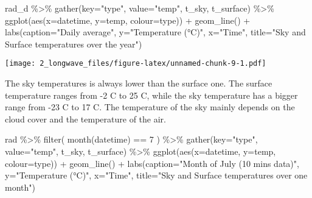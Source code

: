 \documentclass[
]{article}
\newenvironment{Shaded}{\begin{snugshade}}{\end{snugshade}}
\newcommand{\AttributeTok}[1]{\textcolor[rgb]{0.77,0.63,0.00}{#1}}
\newcommand{\DecValTok}[1]{\textcolor[rgb]{0.00,0.00,0.81}{#1}}
\newcommand{\FunctionTok}[1]{\textcolor[rgb]{0.00,0.00,0.00}{#1}}
\newcommand{\NormalTok}[1]{#1}
\newcommand{\SpecialCharTok}[1]{\textcolor[rgb]{0.00,0.00,0.00}{#1}}
\newcommand{\StringTok}[1]{\textcolor[rgb]{0.31,0.60,0.02}{#1}}
\begin{document}
\begin{Shaded}
\begin{Highlighting}[]
\NormalTok{rad\_d }\SpecialCharTok{\%\textgreater{}\%}
  \FunctionTok{gather}\NormalTok{(}\AttributeTok{key=}\StringTok{"type"}\NormalTok{, }\AttributeTok{value=}\StringTok{"temp"}\NormalTok{, t\_sky, t\_surface) }\SpecialCharTok{\%\textgreater{}\%}
\FunctionTok{ggplot}\NormalTok{(}\FunctionTok{aes}\NormalTok{(}\AttributeTok{x=}\NormalTok{datetime, }\AttributeTok{y=}\NormalTok{temp, }\AttributeTok{colour=}\NormalTok{type)) }\SpecialCharTok{+}
  \FunctionTok{geom\_line}\NormalTok{()  }\SpecialCharTok{+}
  \FunctionTok{labs}\NormalTok{(}\AttributeTok{caption=}\StringTok{"Daily average"}\NormalTok{, }\AttributeTok{y=}\StringTok{"Temperature (°C)"}\NormalTok{, }\AttributeTok{x=}\StringTok{"Time"}\NormalTok{,}
       \AttributeTok{title=}\StringTok{"Sky and Surface temperatures over the year"}\NormalTok{)}
\end{Highlighting}
\end{Shaded}

\texttt{[image: 2\_longwave\_files/figure-latex/unnamed-chunk-9-1.pdf]}

The sky temperatures is always lower than the surface one. The surface
temperature ranges from -2 C to 25 C, while the sky temperature has a
bigger range from -23 C to 17 C. The temperature of the sky mainly
depends on the cloud cover and the temperature of the air. \newpage

\begin{Shaded}
\begin{Highlighting}[]
\NormalTok{rad }\SpecialCharTok{\%\textgreater{}\%}
  \FunctionTok{filter}\NormalTok{( }\FunctionTok{month}\NormalTok{(datetime) }\SpecialCharTok{==} \DecValTok{7}\NormalTok{ ) }\SpecialCharTok{\%\textgreater{}\%}
  \FunctionTok{gather}\NormalTok{(}\AttributeTok{key=}\StringTok{"type"}\NormalTok{, }\AttributeTok{value=}\StringTok{"temp"}\NormalTok{, t\_sky, t\_surface) }\SpecialCharTok{\%\textgreater{}\%}
\FunctionTok{ggplot}\NormalTok{(}\FunctionTok{aes}\NormalTok{(}\AttributeTok{x=}\NormalTok{datetime, }\AttributeTok{y=}\NormalTok{temp, }\AttributeTok{colour=}\NormalTok{type)) }\SpecialCharTok{+}
  \FunctionTok{geom\_line}\NormalTok{()  }\SpecialCharTok{+}
  \FunctionTok{labs}\NormalTok{(}\AttributeTok{caption=}\StringTok{"Month of July (10 mins data)"}\NormalTok{, }\AttributeTok{y=}\StringTok{"Temperature (°C)"}\NormalTok{, }\AttributeTok{x=}\StringTok{"Time"}\NormalTok{,}
       \AttributeTok{title=}\StringTok{"Sky and Surface temperatures over one month"}\NormalTok{)}
\end{Highlighting}
\end{Shaded}
\end{document}
